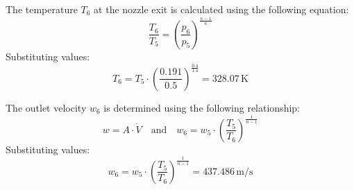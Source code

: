 The temperature \( T_6 \) at the nozzle exit is calculated using the following equation:  
\[
\frac{T_6}{T_5} = \left( \frac{p_6}{p_5} \right)^{\frac{\kappa - 1}{\kappa}}
\]  
Substituting values:  
\[
T_6 = T_5 \cdot \left( \frac{0.191}{0.5} \right)^{\frac{0.4}{1.4}} = 328.07 \, \text{K}
\]  

The outlet velocity \( w_6 \) is determined using the following relationship:  
\[
w = A \cdot \dot{V} \quad \text{and} \quad w_6 = w_5 \cdot \left( \frac{T_5}{T_6} \right)^{\frac{1}{n-1}}
\]  
Substituting values:  
\[
w_6 = w_5 \cdot \left( \frac{T_5}{T_6} \right)^{\frac{1}{n-1}} = 437.486 \, \text{m/s}
\]